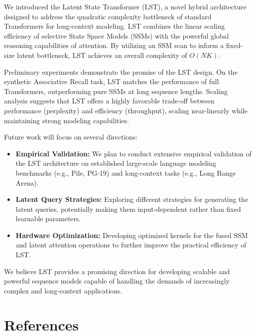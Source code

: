\documentclass[10pt,twocolumn,letterpaper]{article}
\begin{document}
We introduced the Latent State Transformer (LST), a novel hybrid architecture designed to address the quadratic complexity bottleneck of standard Transformers for long-context modeling. LST combines the linear scaling efficiency of selective State Space Models (SSMs) with the powerful global reasoning capabilities of attention. By utilizing an SSM scan to inform a fixed-size latent bottleneck, LST achieves an overall complexity of \(O(NK)\).

Preliminary experiments demonstrate the promise of the LST design. On the synthetic Associative Recall task, LST matches the performance of full Transformers, outperforming pure SSMs at long sequence lengths. Scaling analysis suggests that LST offers a highly favorable trade-off between performance (perplexity) and efficiency (throughput), scaling near-linearly while maintaining strong modeling capabilities.

Future work will focus on several directions:
\begin{itemize}
    \item \textbf{Empirical Validation:} We plan to conduct extensive empirical validation of the LST architecture on established large-scale language modeling benchmarks (e.g., Pile, PG-19) and long-context tasks (e.g., Long Range Arena).
    \item \textbf{Latent Query Strategies:} Exploring different strategies for generating the latent queries, potentially making them input-dependent rather than fixed learnable parameters.
    \item \textbf{Hardware Optimization:} Developing optimized kernels for the fused SSM and latent attention operations to further improve the practical efficiency of LST.
\end{itemize}
We believe LST provides a promising direction for developing scalable and powerful sequence models capable of handling the demands of increasingly complex and long-context applications.

\section*{References}

\small

\end{document}
